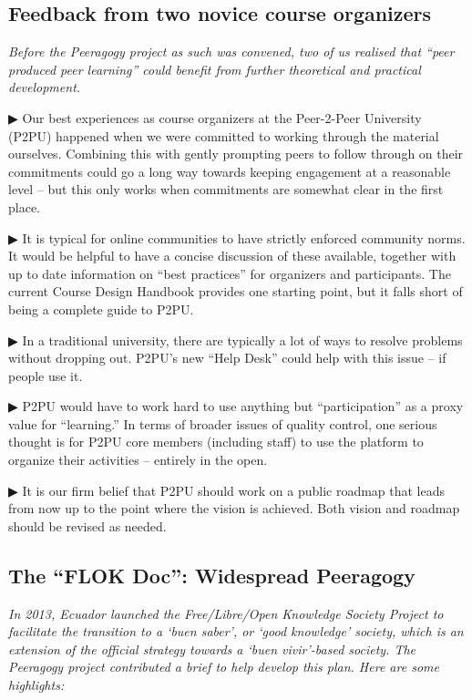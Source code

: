 \subsection{Feedback from two novice course organizers}

\emph{Before the Peeragogy project as such was convened, two of us
  realised that ``peer produced peer learning'' could benefit from
  further theoretical and practical development.}

▶ Our best experiences as course organizers at the Peer-2-Peer
  University (P2PU) happened when we were committed to working through the material ourselves. Combining this with gently prompting peers to follow through on their commitments could go a long way towards keeping engagement at a reasonable level – but this only works when commitments are somewhat clear in the first place. 

▶ It is typical for online communities to have strictly enforced community norms. It would be helpful to have a concise discussion of these available, together with up to date information on “best practices” for organizers and participants. The current Course Design Handbook provides one starting point, but it falls short of being a complete guide to P2PU.

▶ In a traditional university, there are typically a lot of ways to resolve problems without dropping out. P2PU’s new “Help Desk” could help with this issue -- if people use it.

▶ P2PU would have to work hard to use anything but “participation” as a proxy value for ``learning.'' In terms of broader issues of quality control, one serious thought is for P2PU core members (including staff) to use the platform to organize their activities – entirely in the open.

▶ It is our firm belief that P2PU should work on a public roadmap that leads from now up to the point where the vision is achieved. Both vision and roadmap should be revised as needed.


\subsection{The ``FLOK Doc'': Widespread Peeragogy}
\noindent \emph{In 2013, Ecuador launched the Free/Libre/Open Knowledge Society Project to facilitate the transition to a ‘\emph{buen saber}’, or ‘good knowledge’ society, which is an extension of the official strategy towards a ‘\emph{buen vivir}’-based society.  The Peeragogy project contributed a brief to help develop this plan.  Here are some highlights:}

